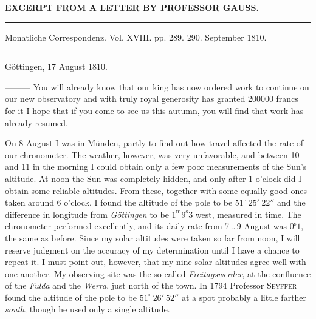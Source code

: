 \clearpage{}\hypertarget{native-323-lower}{}\label{native-323-lower}

\begin{center}\textbf{EXCERPT FROM A LETTER BY PROFESSOR GAUSS.}\par\vspace{4pt}\hrule\vspace{4pt}\fontsize{10}{12}\selectfont Monatliche Correspondenz. Vol. XVIII. pp. 289. 290. September 1810.\par\vspace{4pt}\hrule\vspace{4pt}\end{center}
\begin{flushright}Göttingen, 17 August 1810.\end{flushright}

\par\indent ---\enspace---\enspace--- You will already know that our king has now ordered work to continue on our new observatory and with truly royal generosity has granted 200000 francs for it
I hope that if you come to see us this autumn, you will find that work has already resumed.

On 8 August I was in Münden, partly to find out how travel affected the rate of our chronometer. The weather, however, was very unfavorable, and between 10 and 11 in the morning I could obtain only a few poor measurements of the Sun's altitude. At noon the Sun was completely hidden, and only after 1 o'clock did I obtain some reliable altitudes. From these, together with some equally good ones taken around 6 o'clock, I found the altitude of the pole to be $51^\circ\ 25'\ 22''$ and the difference in longitude from \emph{Göttingen} to be $1^{\text{m}}9^{\text{s}}3$ west, measured in time. The chronometer performed excellently, and its daily rate from 7\,..\,9 August was $0^{\text{s}}1$, the same as before. Since my solar altitudes were taken so far from noon, I will reserve judgment on the accuracy of my determination until I have a chance to repeat it. I must point out, however, that my nine solar altitudes agree well with one another. My observing site was the so-called \emph{Freitagswerder}, at the confluence of the \emph{Fulda} and the \emph{Werra}, just north of the town. In 1794 Professor \textsc{Seyffer} found the altitude of the pole to be $51^\circ\ 26'\ 52''$ at a spot probably a little farther \emph{south}, though he used only a single altitude.
